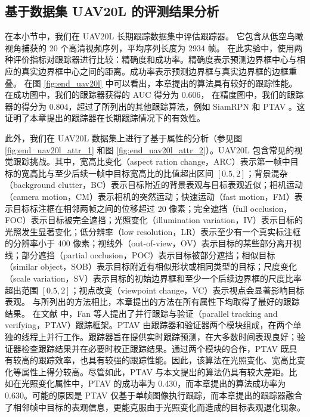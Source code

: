 \subsection{基于数据集 UAV20L 的评测结果分析}
在本小节中，我们在 UAV20L \cite{mueller2016benchmark} 长期跟踪数据集中评估跟踪器。
它包含从低空鸟瞰视角捕获的 20 个高清视频序列，平均序列长度为 2934 帧。
在此实验中，使用两种评价指标对跟踪器进行比较：精确度和成功率。精确度表示预测边界框中心与相应的真实边界框中心之间的距离。成功率表示预测边界框与真实边界框的边框重叠。
在图 \ref{fig:end_uav20l} 中可以看出，本章提出的算法具有较好的跟踪性能。
在成功图中，我们的跟踪器获得的 AUC 得分为 0.606，
在精度图中，我们的跟踪器的得分为 0.804，超过了所列出的其他跟踪算法，例如 SiamRPN \cite{SiamRPN} 和 PTAV \cite{fan2018parallel}。这证明了本章提出的跟踪器在长期跟踪情况下的有效性。

此外，我们在 UAV20L 数据集上进行了基于属性的分析（参见图 \ref{fig:end_uav20l_attr_1} 和图 \ref{fig:end_uav20l_attr_2}）。UAV20L 包含常见的视觉跟踪挑战。其中，宽高比变化（aspect ration change，ARC）表示第一帧中目标的宽高比与至少后续一帧中目标宽高比的比值超出区间 $[0.5, 2]$；背景混杂（background clutter，BC）表示目标附近的背景表观与目标表观近似；相机运动（camera motion，CM）表示相机的突然运动；快速运动（fast motion，FM）表示目标标注框在相邻两帧之间的位移超过 20 像素；完全遮挡（full occlusion，FOC）表示目标被完全遮挡；光照变化（illumination variation，IV）表示目标的光照发生显著变化；低分辨率（low resolution，LR）表示至少有一个真实标注框的分辨率小于 400 像素；视线外（out-of-view，OV）表示目标的某些部分离开视线；部分遮挡（partial occlusion，POC）表示目标被部分遮挡；相似目标（similar object，SOB）表示目标附近有相似形状或相同类型的目标；尺度变化（scale variation，SV）表示目标的初始边界框和至少一个后续边界框的尺度比率超出范围 $[0.5, 2]$；视点改变（viewpoint change，VC）表示视点会显著影响目标表观。
与所列出的方法相比，本章提出的方法在所有属性下均取得了最好的跟踪结果。
在文献 \cite{fan2018parallel} 中，Fan 等人提出了并行跟踪与验证（parallel tracking and verifying，PTAV）跟踪框架。PTAV 由跟踪器和验证器两个模块组成，在两个单独的线程上并行工作。跟踪器旨在提供实时跟踪预测，在大多数时间表现良好；验证器检查跟踪结果并在必要时校正跟踪结果。通过两个模块的合作，PTAV 既具有较高的跟踪效率，也具有较强的跟踪性能。因此，该算法在光照变化、宽高比变化等属性上得分较高。尽管如此，PTAV 与本文提出的算法仍具有较大差距。比如在光照变化属性中，PTAV 的成功率为 0.430，而本章提出的算法成功率为 0.630。可能的原因是 PTAV 仅基于单帧图像执行跟踪，而本章提出的跟踪器融合了相邻帧中目标的表观信息，更能克服由于光照变化而造成的目标表观退化现象。

